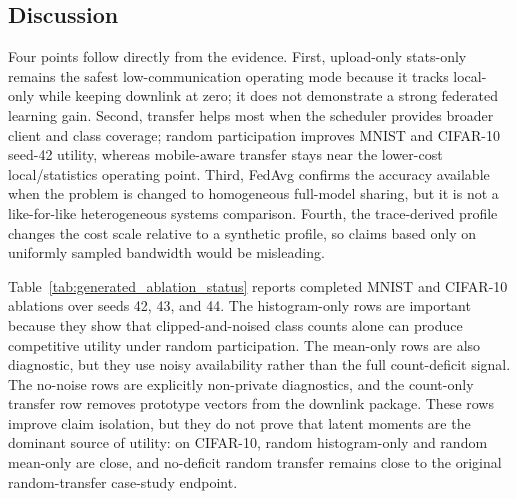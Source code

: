 \documentclass[10pt,journal]{IEEEtran}
\newcommand{\localonly}{local-only}
\newcommand{\statsonly}{stats-only}
\begin{document}
\subsection{Discussion}
Four points follow directly from the evidence. First, upload-only \statsonly{} remains the safest low-communication operating mode because it tracks \localonly{} while keeping downlink at zero; it does not demonstrate a strong federated learning gain. Second, transfer helps most when the scheduler provides broader client and class coverage; random participation improves MNIST and CIFAR-10 seed-42 utility, whereas mobile-aware transfer stays near the lower-cost local/statistics operating point. Third, FedAvg confirms the accuracy available when the problem is changed to homogeneous full-model sharing, but it is not a like-for-like heterogeneous systems comparison. Fourth, the trace-derived profile changes the cost scale relative to a synthetic profile, so claims based only on uniformly sampled bandwidth would be misleading.

Table~\ref{tab:generated_ablation_status} reports completed MNIST and CIFAR-10 ablations over seeds 42, 43, and 44. The histogram-only rows are important because they show that clipped-and-noised class counts alone can produce competitive utility under random participation. The mean-only rows are also diagnostic, but they use noisy availability rather than the full count-deficit signal. The no-noise rows are explicitly non-private diagnostics, and the count-only transfer row removes prototype vectors from the downlink package. These rows improve claim isolation, but they do not prove that latent moments are the dominant source of utility: on CIFAR-10, random histogram-only and random mean-only are close, and no-deficit random transfer remains close to the original random-transfer case-study endpoint.


\end{document}
